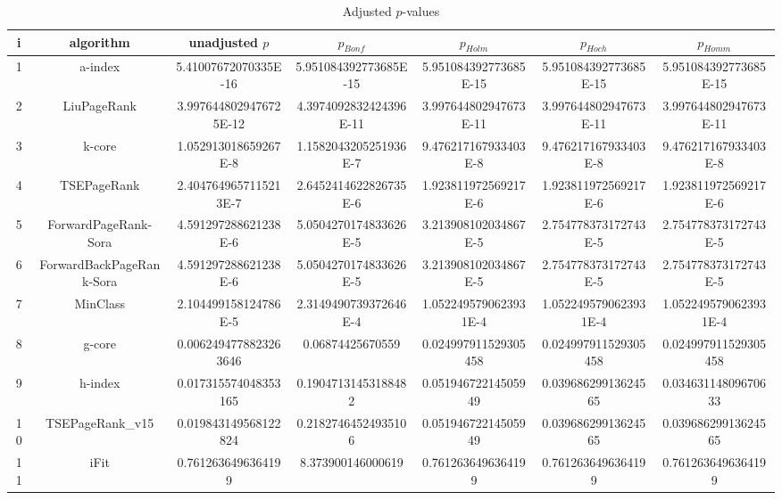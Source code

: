 \documentclass[a4paper,10pt]{article}
\begin{document}
\begin{landscape}
\begin{table}[!htp]
\centering\tiny
\caption{Adjusted $p$-values}
\begin{tabular}{ccccccc}
i&algorithm&unadjusted $p$&$p_{Bonf}$&$p_{Holm}$&$p_{Hoch}$&$p_{Homm}$\\
\hline
1&a-index&5.41007672070335E-16&5.951084392773685E-15&5.951084392773685E-15&5.951084392773685E-15&5.951084392773685E-15\\
2&LiuPageRank&3.9976448029476725E-12&4.3974092832424396E-11&3.997644802947673E-11&3.997644802947673E-11&3.997644802947673E-11\\
3&k-core&1.052913018659267E-8&1.1582043205251936E-7&9.476217167933403E-8&9.476217167933403E-8&9.476217167933403E-8\\
4&TSEPageRank&2.4047649657115213E-7&2.6452414622826735E-6&1.923811972569217E-6&1.923811972569217E-6&1.923811972569217E-6\\
5&ForwardPageRank-Sora&4.591297288621238E-6&5.0504270174833626E-5&3.213908102034867E-5&2.754778373172743E-5&2.754778373172743E-5\\
6&ForwardBackPageRank-Sora&4.591297288621238E-6&5.0504270174833626E-5&3.213908102034867E-5&2.754778373172743E-5&2.754778373172743E-5\\
7&MinClass&2.104499158124786E-5&2.3149490739372646E-4&1.0522495790623931E-4&1.0522495790623931E-4&1.0522495790623931E-4\\
8&g-core&0.0062494778823263646&0.06874425670559&0.024997911529305458&0.024997911529305458&0.024997911529305458\\
9&h-index&0.017315574048353165&0.19047131453188482&0.05194672214505949&0.03968629913624565&0.03463114809670633\\
10&TSEPageRank_v15&0.019843149568122824&0.21827464524935106&0.05194672214505949&0.03968629913624565&0.03968629913624565\\
11&iFit&0.7612636496364199&8.373900146000619&0.7612636496364199&0.7612636496364199&0.7612636496364199\\
\hline
\end{tabular}
\end{table}


\end{landscape}
\end{document}
